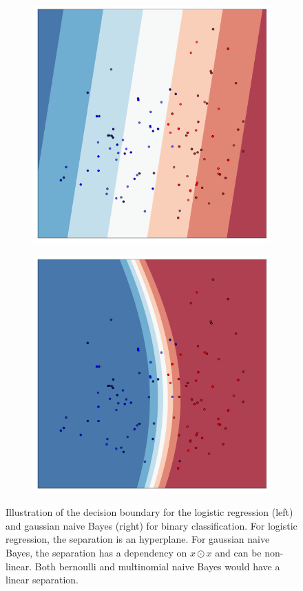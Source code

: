 \begin{figure}
        \centering
        \begin{subfigure}{.5\textwidth}
                \centering
                \includegraphics[width=0.75\linewidth]{figures/log_reg_classification.pdf}
                \label{fig:log_reg_classification}
        \end{subfigure}%
        \begin{subfigure}{.5\textwidth}
                \centering
                \includegraphics[width=0.75\linewidth]{figures/nb_classification.pdf}
                \label{fig:nb_classification}
        \end{subfigure}
        \caption{
                Illustration of the decision boundary for the logistic regression (left)
                and gaussian naive Bayes (right) for binary classification.
                For logistic regression, the separation is an hyperplane.
                For gaussian naive Bayes, the separation has a dependency on $x \odot x$ and can be non-linear.
                Both bernoulli and multinomial naive Bayes would have a linear separation.
        }
        \label{fig:log_reg_nb_comparison}
\end{figure}

